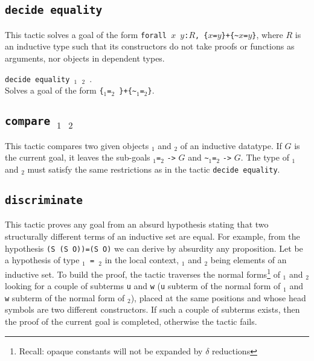 \subsection{\tt decide equality
\label{decideequality}
}

This tactic solves a goal of the form
{\tt forall $x$ $y$:$R$, \{$x$=$y$\}+\{\verb|~|$x$=$y$\}}, where $R$
is an inductive type such that its constructors do not take proofs or
functions as arguments, nor objects in dependent types.

\begin{Variants}
\item {\tt decide equality {\term}$_1$ {\term}$_2$ }.\\
 Solves a goal of the form {\tt \{}\term$_1${\tt =}\term$_2${\tt
\}+\{\verb|~|}\term$_1${\tt =}\term$_2${\tt \}}.
\end{Variants}

\subsection{\tt compare \term$_1$ \term$_2$
}

This tactic compares two given objects \term$_1$ and \term$_2$ 
of an inductive datatype. If $G$ is the current goal, it leaves the sub-goals
\term$_1${\tt =}\term$_2$ {\tt ->} $G$ and \verb|~|\term$_1${\tt =}\term$_2$
{\tt ->} $G$. The type
of \term$_1$ and \term$_2$ must satisfy the same restrictions as in the tactic
\texttt{decide equality}.

\subsection{\tt discriminate {\ident}
\label{discriminate}
}

This tactic proves any goal from an absurd hypothesis stating that two
structurally different terms of an inductive set are equal. For
example, from the hypothesis {\tt (S (S O))=(S O)} we can derive by
absurdity any proposition.  Let {\ident} be a hypothesis of type
{\tt{\term$_1$} = {\term$_2$}} in the local context, {\term$_1$} and
{\term$_2$} being elements of an inductive set.  To build the proof,
the tactic traverses the normal forms\footnote{Recall: opaque
  constants will not be expanded by $\delta$ reductions} of
{\term$_1$} and {\term$_2$} looking for a couple of subterms {\tt u}
and {\tt w} ({\tt u} subterm of the normal form of {\term$_1$} and
{\tt w} subterm of the normal form of {\term$_2$}), placed at the same
positions and whose head symbols are two different constructors. If
such a couple of subterms exists, then the proof of the current goal
is completed, otherwise the tactic fails.

